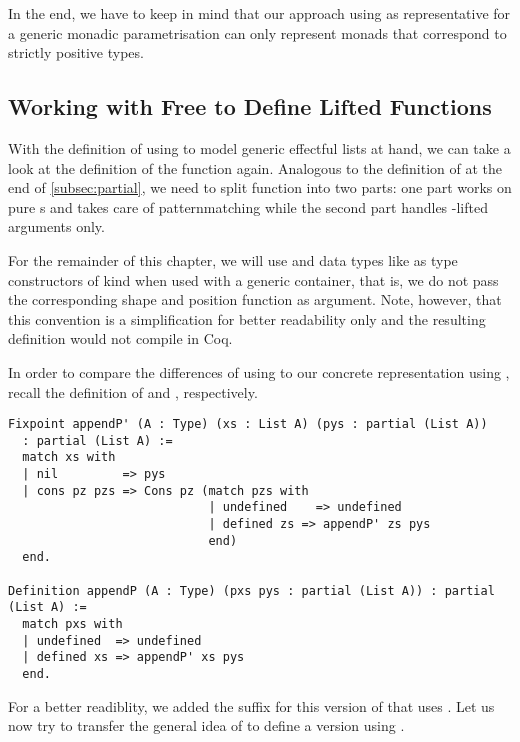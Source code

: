 In the end, we have to keep in mind that our approach using  as representative for a generic monadic parametrisation can only represent monads that correspond to strictly positive types.

\subsection{Working with Free to Define Lifted Functions}
\label{subsec:liftedFunctions}

With the definition of  using  to model generic effectful lists at hand, we can take a look at the definition of the function  again.
Analogous to the definition of  at the end of \autoref{subsec:partial}, we need to split function into two parts: one part works on pure s and takes care of patternmatching while the second part handles -lifted arguments only.

For the remainder of this chapter, we will use  and data types like  as type constructors of kind  when used with a generic container, that is, we do not pass the corresponding shape and position function as argument.
Note, however, that this convention is a simplification for better readability only and the resulting definition would not compile in Coq.

In order to compare the differences of using  to our concrete representation using , recall the definition of  and , respectively.

\begin{verbatim}
Fixpoint appendP' (A : Type) (xs : List A) (pys : partial (List A))
  : partial (List A) :=
  match xs with
  | nil         => pys
  | cons pz pzs => Cons pz (match pzs with
                            | undefined    => undefined
                            | defined zs => appendP' zs pys
                            end)
  end.

Definition appendP (A : Type) (pxs pys : partial (List A)) : partial (List A) :=
  match pxs with
  | undefined  => undefined
  | defined xs => appendP' xs pys
  end.
\end{verbatim}

For a better readiblity, we added the suffix  for this version of  that uses .
Let us now try to transfer the general idea of  to define a version using .

